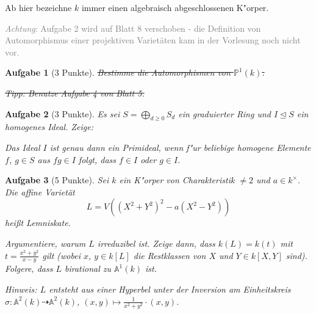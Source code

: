 \documentclass[a4paper, 12pt, numbers=noendperiod, chapterprefix=true, headsepline]{scrbook}
\theoremstyle{break}
\newtheorem{Aufg}{Aufgabe}
\theoremstyle{nonumberbreak}
\theoremstyle{nonumberplain}
\newcommand{\A}{\mathbb{A}}
\newcommand{\IP}{\mathbb{P}}%
\newcommand{\ideal}{\unlhd}
\begin{document}
Ab hier bezeichne $k$ immer einen algebraisch abgeschlossenen K"orper.

\textcolor{gray}{\emph{Achtung}: Aufgabe 2 wird auf Blatt 8 verschoben - die Definition von Automorphismus einer projektiven Variet\"aten kam in der Vorlesung noch nicht vor.}
\begin{Aufg}[3 Punkte]
\sout{Bestimme die Automorphismen von $\IP^1(k)$.}

\sout{\emph{Tipp:} Benutze Aufgabe 4 von Blatt 5.}
\end{Aufg}

\begin{Aufg}[3 Punkte]
Es sei $S = \bigoplus_{d\geq 0} S_d$ ein graduierter Ring und $I\ideal S$ ein homogenes Ideal. Zeige:

Das Ideal $I$ ist genau dann ein Primideal, wenn f"ur beliebige homogene Elemente $f$, $g\in S$ aus $fg\in I$ folgt, dass $f\in I$ oder $g\in I$.
\end{Aufg}

\begin{Aufg}[5 Punkte]
Sei $k$ ein K"orper von Charakteristik $\neq 2$ und  $a\in k^\times$. Die affine Variet\"at
	\[L = V((X^2+Y^2)^2 - a(X^2-Y^2))\]
hei\ss t \emph{Lemniskate}. 

Argumentiere, warum $L$ irreduzibel ist. Zeige dann, dass $k(L) = k(t)$ mit $t = \frac{x^2+y^2}{x-y}$ gilt (wobei $x$, $y\in k[L]$ die Restklassen von $X$ und $Y\in k[X,Y]$ sind). Folgere, dass $L$ birational zu $\A^1(k)$ ist.

\emph{Hinweis: $L$ entsteht aus einer Hyperbel unter der Inversion am Einheitskreis $\sigma: \A^2(k) \dashrightarrow \A^2(k)$, $(x,y)\mapsto \frac{1}{x^2+y^2}\cdot(x,y)$.}
\end{Aufg}
\end{document}

